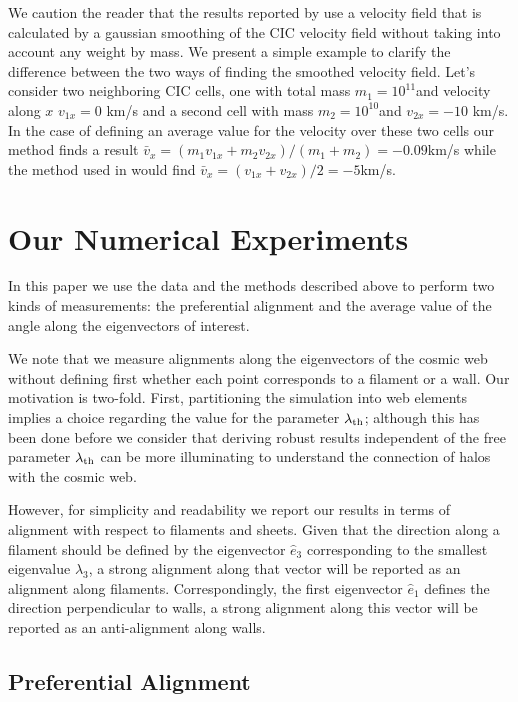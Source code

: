 \documentclass[useAMS,usenatbib]{mn2e}
\newcommand{\hMsun}{{\ifmmode{h^{-1}{\rm
        {M_{\odot}}}}\else{$h^{-1}{\rm{M_{\odot}}}$~}\fi}}
\begin{document}
We caution the reader that the results reported by
\citep{Vweb, Libeskind2013} use a velocity field that is calculated by a
gaussian smoothing of the CIC velocity field without taking into
account any weight by mass. We present a simple example to clarify the difference
between the two ways of finding the smoothed velocity field. Let's consider two
neighboring CIC cells, one with total mass $m_1 = 10^{11}$\hMsun and
velocity along $x$ $v_{1x}=0$ km/s and a second cell with mass $m_2 = 10^{10}$\hMsun and $v_{2x}=-10$ km/s. In the case of defining an average value for the
velocity over these two cells our method finds a result $\bar{v}_x=
(m_1v_{1x} + m_2v_{2x})/(m_1+m_2)= -0.09$km/s while the method used in
\cite{Vweb,Libeskind2013} would find
$\bar{v}_x=(v_{1x}+v_{2x})/2=-5$km/s.





\section{Our Numerical Experiments}
\label{sec:experiments}

In this paper we use the data and the methods described above to
perform two kinds of measurements: the preferential alignment and the
average value of the angle along the eigenvectors of interest.

We note that we measure alignments along the eigenvectors of the
cosmic web without defining first whether each point corresponds to a
filament or a wall. Our motivation is two-fold. First, partitioning the
simulation into web elements implies a choice regarding the value
for the parameter $\lambda_{\rm th}$; although this has been done
before we consider that deriving robust results independent of the
free parameter $\lambda_{\rm th}$ can be more illuminating to
understand the connection of halos with the cosmic web.


However, for simplicity and readability we report our results in terms
of alignment with respect to filaments and sheets. Given that the
direction along a filament should be defined by the eigenvector
$\hat{e}_3$ corresponding to the smallest eigenvalue $\lambda_3$, a
strong alignment along that vector will be reported as an alignment
along filaments. Correspondingly, the first eigenvector $\hat{e}_{1}$
defines the direction perpendicular to walls, a strong alignment along
this vector will be reported as an anti-alignment along walls.

\subsection{Preferential Alignment}
\end{document}
